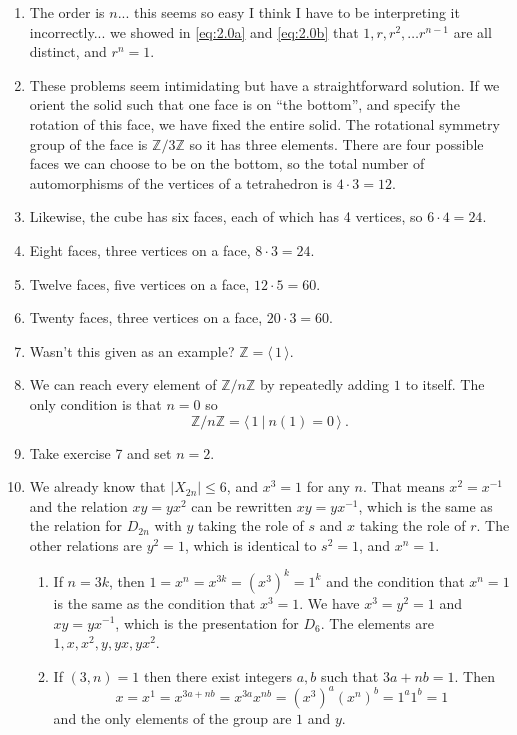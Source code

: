 \documentclass[]{article}
\newcommand{\abs}[1]{\left\vert #1 \right\vert}
\newcommand{\bbz}{\mathbb{Z}}
\begin{document}
\begin{enumerate}
\item The order is $n$... this seems so easy I think I have to be interpreting it incorrectly... we showed in \eqref{eq:2.0a} and \eqref{eq:2.0b} that $1, r, r^2, \ldots r^{n-1}$ are all distinct, and $r^n = 1$.


\item These problems seem intimidating but have a straightforward solution. If we orient the solid such that one face is on ``the bottom'', and specify the rotation of this face, we have fixed the entire solid. The rotational symmetry group of the face is $\bbz /3 \bbz$ so it has three elements. There are four possible faces we can choose to be on the bottom, so the total number of automorphisms of the vertices of a tetrahedron is $4\cdot 3 = 12$.


\item Likewise, the cube has six faces, each of which has 4 vertices, so $6\cdot 4 = 24$.


\item Eight faces, three vertices on a face, $8\cdot 3 = 24$.


\item Twelve faces, five vertices on a face, $12\cdot 5 = 60$.


\item Twenty faces, three vertices on a face, $20\cdot 3 = 60$.


\item Wasn't this given as an example? $\bbz = \langle\, 1\, \rangle$.


\item We can reach every element of $\bbz / n\bbz$ by repeatedly adding $1$ to itself. The only condition is that $n = 0$ so 
\begin{equation}
\bbz / n\bbz = \langle\, 1 \ \vert\ n(1) = 0 \, \rangle\ .
\end{equation}


\item Take exercise 7 and set $n=2$.


\item We already know that $\abs{X_{2n}} \leq 6$, and $x^3 = 1$ for any $n$. That means $x^2 = x^{-1}$ and the relation $xy = yx^2$ can be rewritten $xy = yx^{-1}$, which is the same as the relation for $D_{2n}$ with $y$ taking the role of $s$ and $x$ taking the role of $r$. The other relations are $y^2 = 1$, which is identical to $s^2 = 1$, and $x^n = 1$.
\begin{enumerate}
\item If $n = 3k$, then $1 = x^n = x^{3k} = (x^3)^k = 1^k$ and the condition that $x^n = 1$ is the same as the condition that $x^3 = 1$. We have $x^3 = y^2 = 1$ and $xy = yx^{-1}$, which is the presentation for $D_6$. The elements are $1, x, x^2, y, yx, yx^2$.
\item If $(3,n) = 1$ then there exist integers $a, b$ such that $3a + nb = 1$. Then
\begin{equation}
x = x^1 = x^{3a+nb} = x^{3a}x^{nb} = (x^3)^a (x^n)^b = 1^a 1^b = 1
\end{equation}
and the only elements of the group are $1$ and $y$.
\end{enumerate}



\end{enumerate}
\end{document}
